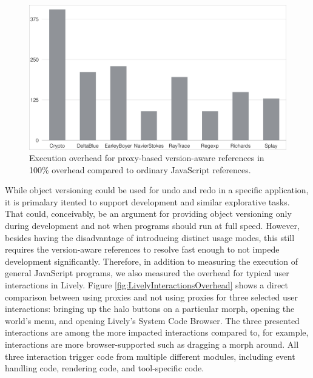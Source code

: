 \begin{figure}[h]
    \centering
    \includegraphics[width=\textwidth]{figures/executionOverhead.pdf}
    \caption{Execution overhead for proxy-based version-aware references in 100\% overhead compared to ordinary JavaScript references.}
    \label{fig:ExecutionOverhead}
\end{figure}


While object versioning could be used for undo and redo in a specific application, it is primalary itented to support development and similar explorative tasks.
That could, conceivably, be an argument for providing object versioning only during development and not when programs should run at full speed.
However, besides having the disadvantage of introducing distinct usage modes, this still requires the version-aware references to resolve fast enough to not impede development significantly.
Therefore, in addition to measuring the execution of general JavaScript programs, we also measured the overhead for typical user interactions in Lively.
Figure \ref{fig:LivelyInteractionsOverhead} shows a direct comparison between using proxies and not using proxies for three selected user interactions: bringing up the halo buttons on a particular morph, opening the world's menu, and opening Lively's System Code Browser.
The three presented interactions are among the more impacted interactions compared to, for example, interactions are more browser-supported such as dragging a morph around.
All three interaction trigger code from multiple different modules, including event handling code, rendering code, and tool-specific code.

